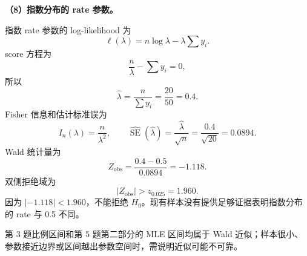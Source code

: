 \documentclass[11pt,a4paper]{article}
\newcommand{\SE}{\operatorname{SE}}
\begin{document}
\begin{solutionbox}
\textbf{（8）指数分布的 rate 参数。}

指数 rate 参数的 log-likelihood 为
\[
  \ell(\lambda)
  =
  n\log\lambda-\lambda\sum y_i.
\]
score 方程为
\[
  \frac n\lambda-\sum y_i=0,
\]
所以
\[
  \boxed{
  \hat\lambda
  =
  \frac n{\sum y_i}
  =
  \frac{20}{50}
  =
  0.4.
  }
\]
Fisher 信息和估计标准误为
\[
  I_n(\lambda)=\frac n{\lambda^2},
  \qquad
  \widehat{\SE}(\hat\lambda)
  =
  \frac{\hat\lambda}{\sqrt n}
  =
  \frac{0.4}{\sqrt{20}}
  =
  0.0894.
\]
Wald 统计量为
\[
  Z_{\mathrm{obs}}
  =
  \frac{0.4-0.5}{0.0894}
  =
  -1.118.
\]
双侧拒绝域为
\[
  |Z_{\mathrm{obs}}|>z_{0.025}=1.960.
\]
因为 $|-1.118|<1.960$，不能拒绝 $H_0$。现有样本没有提供足够证据表明指数分布的 rate 与 0.5 不同。
\end{solutionbox}

\begin{warnbox}
第 3 题比例区间和第 5 题第二部分的 MLE 区间均属于 Wald 近似；样本很小、参数接近边界或区间越出参数空间时，需说明近似可能不可靠。
\end{warnbox}
\end{document}
